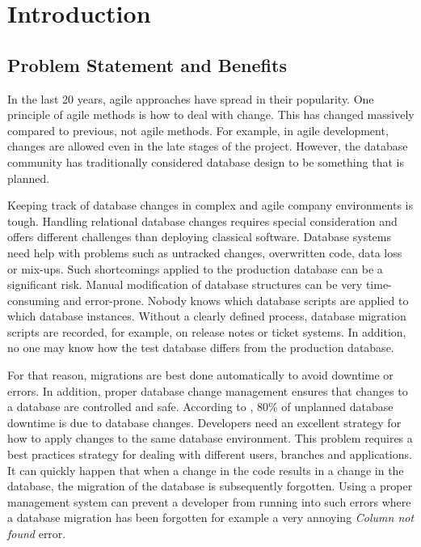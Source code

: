 


\chapter{Introduction}
\section{Problem Statement and Benefits}%
 
 In the last 20 years, agile approaches have spread in their popularity. One principle of agile methods is how to deal with change. This has changed massively compared to previous, not agile methods. For example, in agile development, changes are allowed even in the late stages of the project. However, the database community has traditionally considered database design to be something that is planned.
 
Keeping track of database changes in complex and agile company environments is tough. Handling relational database changes requires special consideration and offers different challenges than deploying classical software. Database systems need help with problems such as untracked changes, overwritten code, data loss or mix-ups. Such shortcomings applied to the production database can be a significant risk. Manual modification of database structures can be very time-consuming and error-prone. Nobody knows which database scripts are applied to which database instances. 
Without a clearly defined process, database migration scripts are recorded, for example, on release notes or ticket systems.
In addition, no one may know how the test database differs from the production database.
 
For that reason, migrations are best done automatically to avoid downtime or errors. In addition, proper database change management ensures that changes to a database are controlled and safe. According to \cite{ManageForce2016}, 80\% of unplanned database downtime is due to database changes.
Developers need an excellent strategy for how to apply changes to the same database environment.
This problem requires a best practices strategy for dealing with different users, branches and applications. It can quickly happen that when a change in the code results in a change in the database, the migration of the database is subsequently forgotten. Using a proper management system can prevent a developer from running into such errors where a database migration has been forgotten for example a very annoying \textit{Column not found} error.

